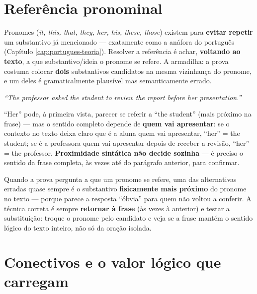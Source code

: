 \section{Referência pronominal}

\begin{conceito}
Pronomes (\textit{it, this, that, they, her, his, these, those}) existem
para \textbf{evitar repetir} um substantivo já mencionado --- exatamente
como a anáfora do português (Capítulo \ref{cap:portugues-teoria}). Resolver
a referência é achar, \textbf{voltando ao texto}, a que substantivo/ideia o
pronome se refere. A armadilha: a prova costuma colocar \textbf{dois}
substantivos candidatos na mesma vizinhança do pronome, e um deles é
gramaticalmente plausível mas semanticamente errado.
\end{conceito}

\begin{exemplo}
\textit{“The professor asked the student to review the report before her
presentation.”}

“Her” pode, à primeira vista, parecer se referir a “the student” (mais
próximo na frase) --- mas o sentido completo depende de \textbf{quem vai
apresentar}: se o contexto no texto deixa claro que é a aluna quem vai
apresentar, “her” = the student; se é a professora quem vai apresentar
depois de receber a revisão, “her” = the professor. \textbf{Proximidade
sintática não decide sozinha} --- é preciso o sentido da frase completa,
às vezes até do parágrafo anterior, para confirmar.
\end{exemplo}

\begin{cuidado}
Quando a prova pergunta a que um pronome se refere, uma das alternativas
erradas quase sempre é o substantivo \textbf{fisicamente mais próximo} do
pronome no texto --- porque parece a resposta “óbvia” para quem não voltou
a conferir. A técnica correta é sempre \textbf{retornar à frase} (às vezes
à anterior) e testar a substituição: troque o pronome pelo candidato e
veja se a frase mantém o sentido lógico do texto inteiro, não só da oração
isolada.
\end{cuidado}

\section{Conectivos e o valor lógico que carregam}

